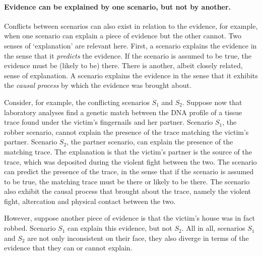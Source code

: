 \documentclass[10pt]{article}
\begin{document}
\paragraph{Evidence can be explained by one scenario, but not by another.} 
Conflicts between scenarios can also exist in relation to the evidence, for example, when one scenario 
can explain a piece of evidence but the other cannot. Two senses of `explanation' are relevant here. First, 
a scenario explains the evidence in the sense that it \textit{predicts} the evidence. If the 
scenario is assumed to be true, the evidence must be (likely to be) there. 
There is another, albeit closely related, sense of explanation. 
A scenario explains the evidence in the sense that it exhibits the \textit{causal process} by which the evidence 
was brought about. 


Consider, for example, the conflicting scenarios $S_1$ and $S_2$.
Suppose now that laboratory analyses find a genetic match between the DNA profile of a tissue trace found under 
the victim's fingernails and her partner. Scenario $S_1$, the robber scenario, cannot explain the presence of the trace matching the victim's 
partner. Scenario $S_2$, the partner scenario, can explain the presence of the matching trace. The explanation is that the victim's partner is the 
source of the trace, which was deposited during the violent fight between the two. The scenario can predict 
the presence of the trace, in the sense that if the scenario is assumed to be true, the matching trace must be there or 
likely to be there. The scenario also exhibit the causal process that brought about the trace, namely the violent fight, altercation 
and physical contact between the two. 

However, suppose another piece of evidence 
is that the victim's house was in fact robbed. Scenario $S_1$ can explain this evidence, 
but not $S_2$. All in all, scenarios $S_1$ and $S_2$ 
are not only inconsistent on their face, they also diverge
in terms of the evidence that they can or cannot explain.
\end{document}
